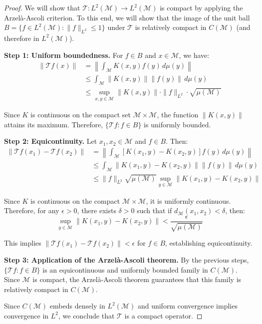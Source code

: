 \begin{proof}
    We will show that $\mathcal{T}: L^2(\mathcal{M}) \to L^2(\mathcal{M})$ is compact by applying the Arzelà-Ascoli criterion. To this end, we will show that the image of the unit ball $B = \{f \in L^2(\mathcal{M}) : \|f\|_{L^2} \leq 1\}$ under $\mathcal{T}$ is relatively compact in $C(\mathcal{M})$ (and therefore in $L^2(\mathcal{M})$).

    \textbf{Step 1: Uniform boundedness.}
    For $f \in B$ and $x \in \mathcal{M}$, we have:
    \begin{align}
        \|\mathcal{T}f(x)\| &= \left\|\int_{\mathcal{M}} K(x, y) f(y) \, d\mu(y)\right\| \\
        &\leq \int_{\mathcal{M}} \|K(x, y)\| \|f(y)\| \, d\mu(y) \\
        &\leq \sup_{x,y \in \mathcal{M}} \|K(x, y)\| \cdot \|f\|_{L^2} \cdot \sqrt{\mu(\mathcal{M})}
    \end{align}

    Since $K$ is continuous on the compact set $\mathcal{M} \times \mathcal{M}$, the function $\|K(x,y)\|$ attains its maximum. Therefore, $\{\mathcal{T}f : f \in B\}$ is uniformly bounded.

    \textbf{Step 2: Equicontinuity.}
    Let $x_1, x_2 \in \mathcal{M}$ and $f \in B$. Then:
    \begin{align}
        \|\mathcal{T}f(x_1) - \mathcal{T}f(x_2)\| &= \left\|\int_{\mathcal{M}} [K(x_1, y) - K(x_2, y)] f(y) \, d\mu(y)\right\| \\
        &\leq \int_{\mathcal{M}} \|K(x_1, y) - K(x_2, y)\| \|f(y)\| \, d\mu(y) \\
        &\leq \|f\|_{L^2} \sqrt{\mu(\mathcal{M})} \sup_{y \in \mathcal{M}} \|K(x_1, y) - K(x_2, y)\|
    \end{align}

    Since $K$ is continuous on the compact $\mathcal{M} \times \mathcal{M}$, it is uniformly continuous. Therefore, for any $\epsilon > 0$, there exists $\delta > 0$ such that if $d_{\mathcal{M}}(x_1, x_2) < \delta$, then:
    \[\sup_{y \in \mathcal{M}} \|K(x_1, y) - K(x_2, y)\| < \frac{\epsilon}{\sqrt{\mu(\mathcal{M})}}\]

    This implies $\|\mathcal{T}f(x_1) - \mathcal{T}f(x_2)\| < \epsilon$ for $f \in B$, establishing equicontinuity.

    \textbf{Step 3: Application of the Arzelà-Ascoli theorem.}
    By the previous steps, $\{\mathcal{T}f : f \in B\}$ is an equicontinuous and uniformly bounded family in $C(\mathcal{M})$. Since $\mathcal{M}$ is compact, the Arzelà-Ascoli theorem guarantees that this family is relatively compact in $C(\mathcal{M})$.

    Since $C(\mathcal{M})$ embeds densely in $L^2(\mathcal{M})$ and uniform convergence implies convergence in $L^2$, we conclude that $\mathcal{T}$ is a compact operator.
\end{proof}

